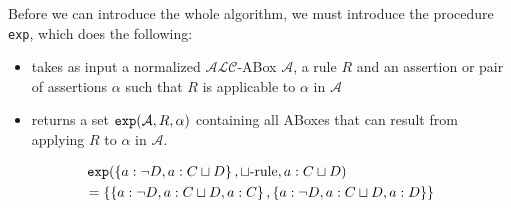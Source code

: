 Before we can introduce the whole algorithm, we must introduce the procedure \texttt{exp}, which does the following:
\begin{itemize}
	\item takes as input a normalized $\mathcal{ALC}$-ABox $\mathcal{A}$, a rule $R$ and an assertion or pair of assertions $\alpha$
		such that $R$ is applicable to $\alpha$ in  $\mathcal{A}$
	\item returns a set $\operatorname{\text{\texttt{exp}}}(\mathcal{A},R,\alpha)$ containing all  ABoxes that can result from applying $R$ to $\alpha$ in $\mathcal{A}$.
\end{itemize}
\begin{example}
	\[
	\begin{split}
		&\func{\texttt{exp}}(\left\{ a : \neg D, a : C \sqcup D \right\}, \sqcup \text{-rule}, a : C \sqcup D) \\
		&= \left\{ \left\{  a : \neg D, a : C \sqcup D, a : C\right\}, \left\{  a : \neg D, a : C \sqcup D, a : D\right\} \right\}
	\end{split}
	\]
\end{example}

